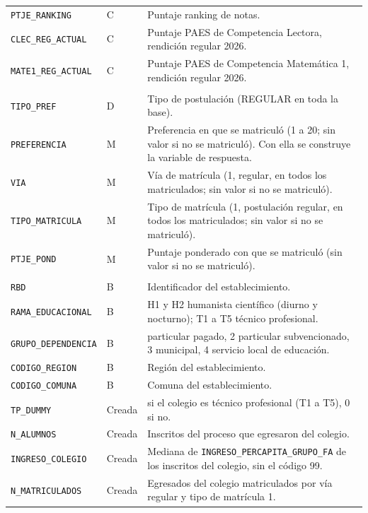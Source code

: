 \documentclass[11pt]{article}
\begin{document}
\begin{longtable}{>{\raggedright\arraybackslash}p{5.4cm}
                  >{\raggedright\arraybackslash}p{1.4cm}
                  >{\raggedright\arraybackslash}p{6.6cm}}
\texttt{PTJE\_RANKING} & C & Puntaje ranking de notas. \\
\texttt{CLEC\_REG\_ACTUAL} & C & Puntaje PAES de Competencia Lectora, rendición regular 2026. \\
\texttt{MATE1\_REG\_ACTUAL} & C & Puntaje PAES de Competencia Matemática 1, rendición regular 2026. \\
\midrule
\multicolumn{3}{l}{\textit{Postulación y matrícula}} \\
\texttt{TIPO\_PREF} & D & Tipo de postulación (REGULAR en toda la base). \\
\texttt{PREFERENCIA} & M & Preferencia en que se matriculó (1 a 20; sin valor si no se matriculó). Con ella se construye la variable de respuesta. \\
\texttt{VIA} & M & Vía de matrícula (1, regular, en todos los matriculados; sin valor si no se matriculó). \\
\texttt{TIPO\_MATRICULA} & M & Tipo de matrícula (1, postulación regular, en todos los matriculados; sin valor si no se matriculó). \\
\texttt{PTJE\_POND} & M & Puntaje ponderado con que se matriculó (sin valor si no se matriculó). \\
\midrule
\multicolumn{3}{l}{\textit{Colegio de egreso}} \\
\texttt{RBD} & B & Identificador del establecimiento. \\
\texttt{RAMA\_EDUCACIONAL} & B & H1 y H2 humanista científico (diurno y nocturno); T1 a T5 técnico profesional. \\
\texttt{GRUPO\_DEPENDENCIA} & B & 1 particular pagado, 2 particular subvencionado, 3 municipal, 4 servicio local de educación. \\
\texttt{CODIGO\_REGION} & B & Región del establecimiento. \\
\texttt{CODIGO\_COMUNA} & B & Comuna del establecimiento. \\
\texttt{TP\_DUMMY} & Creada & 1 si el colegio es técnico profesional (T1 a T5), 0 si no. \\
\texttt{N\_ALUMNOS} & Creada & Inscritos del proceso que egresaron del colegio. \\
\texttt{INGRESO\_COLEGIO} & Creada & Mediana de \texttt{INGRESO\_PERCAPITA\_GRUPO\_FA} de los inscritos del colegio, sin el código 99. \\
\texttt{N\_MATRICULADOS} & Creada & Egresados del colegio matriculados por vía regular y tipo de matrícula 1. \\
\end{longtable}
\end{document}
